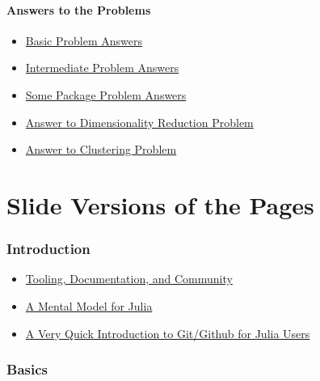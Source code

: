 \documentclass[11pt]{article}
\begin{document}
\paragraph{Answers to the Problems}\label{answers-to-the-problems}

\begin{itemize}
\itemsep1pt\parskip0pt
\item
  \href{http://ucidatascienceinitiative.github.io/IntroToJulia/Html/BasicProblemAnswers}{Basic
  Problem Answers}
\item
  \href{http://ucidatascienceinitiative.github.io/IntroToJulia/Html/IntermediateProblemAnswers}{Intermediate
  Problem Answers}
\item
  \href{http://ucidatascienceinitiative.github.io/IntroToJulia/Html/PackageProblemAnswers}{Some
  Package Problem Answers}
\item
  \href{http://ucidatascienceinitiative.github.io/IntroToJulia/Html/DimensionalityReductionSolutions}{Answer
  to Dimensionality Reduction Problem}
\item
  \href{http://ucidatascienceinitiative.github.io/IntroToJulia/Html/ClusteringSolutions}{Answer
  to Clustering Problem}
\end{itemize}

    \section{Slide Versions of the Pages}\label{slide-versions-of-the-pages}

\subsubsection{Introduction}\label{introduction}

\begin{itemize}
\itemsep1pt\parskip0pt
\item
  \href{http://ucidatascienceinitiative.github.io/IntroToJulia/Slides/ToolingDocumentationCommunity}{Tooling,
  Documentation, and Community}
\item
  \href{http://ucidatascienceinitiative.github.io/IntroToJulia/Slides/JuliaMentalModel}{A
  Mental Model for Julia}
\item
  \href{http://ucidatascienceinitiative.github.io/IntroToJulia/Slides/GithubIntroduction}{A
  Very Quick Introduction to Git/Github for Julia Users}
\end{itemize}

\subsubsection{Basics}\label{basics}
\end{document}
